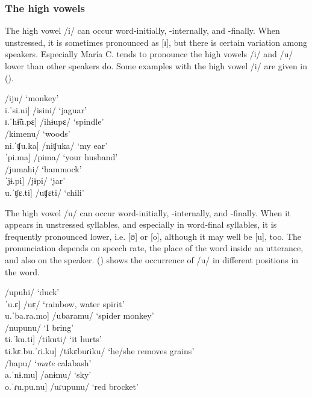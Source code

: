 \subsubsection{The high vowels} \label{paragraph:HighVowels}

The high vowel /i/ can occur word-initially, -internally, and -finally. When unstressed, it is sometimes pronounced as [ɪ], but there is certain variation among speakers. Especially María C. tends to pronounce the high vowels /i/ and /u/ lower than other speakers do. Some examples with the high vowel /i/ are given in ().

\ea\label{ex:i}
\ea     \tab[ˈi.ju] \tab\tab /iju/ \tab\tab ‘monkey’\\
     \tab{[}i.ˈsi.ni] \tab /isini/ \tab ‘jaguar’\\  %
     \tab{[}ɪ.ˈhɨ̃ũ.pɛ] \tab /ihɨupɛ/ \tab ‘spindle’\\
\ex     \tab[ki.ˈmɛ.nu] \tab /kimenu/ \tab ‘woods’\\
     \tab{[}ni.ˈʧu.ka] \tab /niʧuka/ \tab ‘my ear’\\
     \tab{[}ˈpi.ma] \tab /pima/ \tab ‘your husband’\\
\ex  \tab[ju.ˈma.hĩ] \tab /jumahi/ \tab ‘hammock’\\
     \tab{[}ˈjɨ.pi] \tab /jɨpi/ \tab\tab ‘jar’\\
     \tab{[}u.ˈʧɛ.ti] \tab /uʧɛti/ \tab ‘chili’\\%
\z
\xe

The high vowel /u/ can occur word-initially, -internally, and -finally. When it appears in unstressed syllables, and especially in word-final syllables, it is frequently pronounced lower, i.e. [ʊ] or [o], although it may well be [u], too. The pronunciation depends on speech rate, the place of the word inside an utterance, and also on the speaker. () shows the occurrence of /u/ in different positions in the word.

\ea\label{ex:u}
\ea     \tab[u.ˈpu.hĩ] \tab\tab /upuhi/ \tab ‘duck’\\ 
     \tab{[}ˈu.ɛ] \tab\tab\tab /uɛ/ \tab\tab ‘rainbow, water spirit’\\
     \tab{[}u.ˈba.ra.mo] \tab /ubaramu/ \tab ‘spider monkey’\\
\ex  \tab[ˈnu.pu.nʊ] \tab\tab /nupunu/ \tab ‘I bring’\\
     \tab{[}ti.ˈku.ti] \tab\tab /tikuti/ \tab ‘it hurts’\\
     \tab{[}ti.kɛ.bu.ˈɾi.ku] \tab /tikɛbuɾiku/ \tab ‘he/she removes grains’\\
\ex  \tab[ˈhã.pu] \tab\tab /hapu/ \tab ‘\textit{mate} calabash’\\
     \tab{[}a.ˈnɨ.mu] \tab\tab /anɨmu/ \tab ‘sky’\\
     \tab{[}o.ˈɾu.pu.nu] \tab /uɾupunu/ \tab ‘red brocket’\\%
\z
\xe


